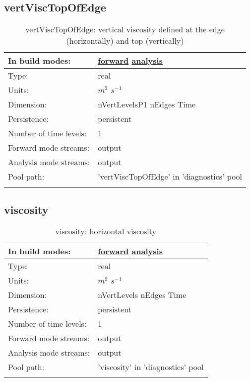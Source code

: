 \subsection[vertViscTopOfEdge]{vertViscTopOfEdge}
\label{subsec:var_sec_diagnostics_vertViscTopOfEdge}
\begin{center}
\begin{longtable}{| p{2.0in} | p{4.0in} |}
        \hline 
        In build modes: & \hyperref[subsec:forward_var_tab_diagnostics]{forward} \hyperref[subsec:analysis_var_tab_diagnostics]{analysis} \\
        \hline 
        Type: & real \\
        \hline 
        Units: & $m^2$ $s^{-1}$ \\
        \hline 
        Dimension: & nVertLevelsP1 nEdges Time \\
        \hline 
        Persistence: & persistent \\
        \hline 
        Number of time levels: & 1 \\
        \hline 
		 Forward mode streams: &  output \\
        \hline 
		 Analysis mode streams: &  output \\
        \hline 
            Pool path: & 'vertViscTopOfEdge' in 'diagnostics' pool
 \\
		 \hline 
    \caption{vertViscTopOfEdge: vertical viscosity defined at the edge (horizontally) and top (vertically)}
\end{longtable}
\end{center}
\subsection[viscosity]{viscosity}
\label{subsec:var_sec_diagnostics_viscosity}
\begin{center}
\begin{longtable}{| p{2.0in} | p{4.0in} |}
        \hline 
        In build modes: & \hyperref[subsec:forward_var_tab_diagnostics]{forward} \hyperref[subsec:analysis_var_tab_diagnostics]{analysis} \\
        \hline 
        Type: & real \\
        \hline 
        Units: & $m^2$ $s^{-1}$ \\
        \hline 
        Dimension: & nVertLevels nEdges Time \\
        \hline 
        Persistence: & persistent \\
        \hline 
        Number of time levels: & 1 \\
        \hline 
		 Forward mode streams: &  output \\
        \hline 
		 Analysis mode streams: &  output \\
        \hline 
            Pool path: & 'viscosity' in 'diagnostics' pool
 \\
		 \hline 
    \caption{viscosity: horizontal viscosity}
\end{longtable}
\end{center}

